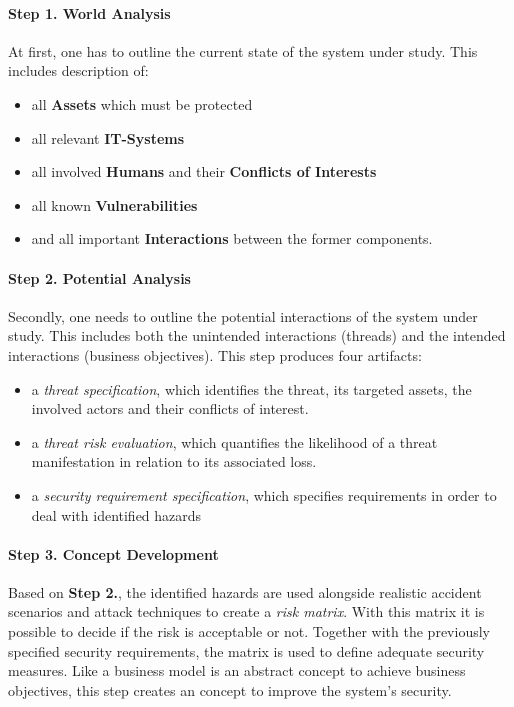 

\paragraph*{Step 1. World Analysis}

At first, one has to outline the current state of the system under study. This includes description of:
\begin{itemize}
\item all \textbf{Assets} which must be protected
\item all relevant \textbf{IT-Systems}
\item all involved \textbf{Humans} and their \textbf{Conflicts of Interests}
\item all known \textbf{Vulnerabilities}
\item and all important \textbf{Interactions} between the former components.
\end{itemize}

\paragraph*{Step 2. Potential Analysis}

Secondly, one needs to outline the potential interactions of the system under study.
This includes both the unintended interactions (threads) and the intended interactions (business objectives).
This step produces four artifacts:
\begin{itemize}
\item a \emph{threat specification}, which identifies the threat, its targeted assets, the involved actors and their conflicts of interest.
\item a \emph{threat risk evaluation}, which quantifies the likelihood of a threat manifestation in relation to its associated loss.
\item a \emph{security requirement specification}, which specifies requirements in order to deal with identified hazards
\end{itemize}

\paragraph*{Step 3. Concept Development}

Based on \textbf{Step 2.}, the identified hazards are used alongside realistic accident scenarios and attack techniques to create a \emph{risk matrix}.
With this matrix it is possible to decide if the risk is acceptable or not.
Together with the previously specified security requirements, the matrix is used to define adequate security measures.
Like a business model is an abstract concept to achieve business objectives, this step creates an concept to improve the system's security.

